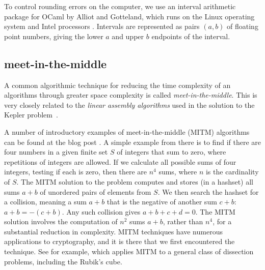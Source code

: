 To control
  rounding errors on the computer, we use an interval arithmetic
  package for OCaml by Alliot and Gotteland, which runs on the Linux
  operating system and Intel processors \cite{All}.  Intervals are represented as 
  pairs $(a,b)$ of floating point numbers, giving the lower $a$ and upper $b$ endpoints
of the interval. 



\subsection{meet-in-the-middle}

A common algorithmic technique for reducing the time complexity of an
algorithms through greater space complexity is called {\it
  meet-in-the-middle}.  This is very closely related to the {\it
  linear assembly algorithms} used in the solution to the Kepler
problem~\cite{hales2003some}.

A number of introductory examples of meet-in-the-middle (MITM)
algorithms can be found at the blog post \cite{mitm}.
A simple example from there is to find if there are four numbers in a
given finite set $S$ of integers that sum to zero, where repetitions
of integers are allowed.  If we calculate all possible sums of four
integers, testing if each is zero, then there are $n^4$ sums, where
$n$ is the cardinality of $S$.  The MITM solution to the problem
computes and stores (in a hashset) all sums $a+b$ of unordered pairs
of elements from $S$.  We then search the hashset for a collision,
meaning a sum $a+b$ that is the negative of another sum $c+b$: $a+b =
-(c+b)$.  Any such collision gives $a+b+c+d=0$.  The MITM solution
involves the computation of $n^2$ sums $a+b$, rather than $n^4$, for a
substantial reduction in complexity.  MITM techniques have numerous
applications to cryptography, and it is there that we first
encountered the technique.  See for example,
\cite{dinur2014dissection}
which applies MITM to a general class of dissection problems,
including the Rubik's cube.


